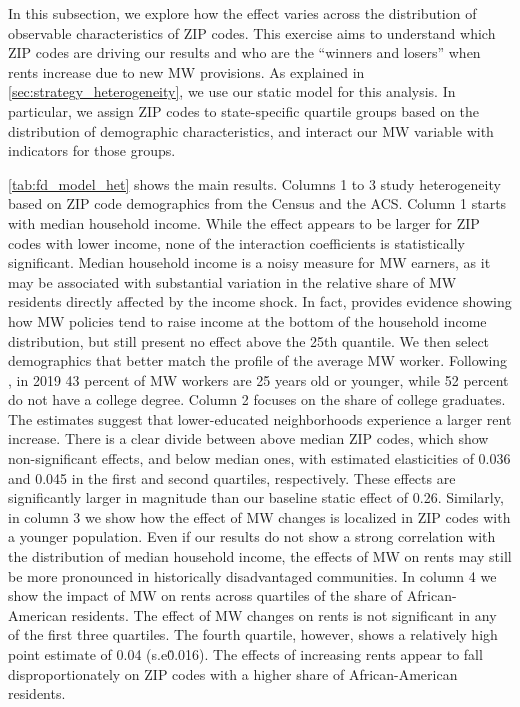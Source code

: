 In this subsection, we explore how the effect varies across the distribution of observable 
characteristics of ZIP codes. This exercise aims to understand which ZIP codes are driving 
our results and who are the ``winners and losers'' when rents increase due to new MW provisions. 
As explained in \autoref{sec:strategy_heterogeneity}, we use our static model for this analysis. 
In particular, we assign ZIP codes to state-specific quartile groups based on the distribution of 
demographic characteristics, and interact our MW variable with indicators for those groups. 

\autoref{tab:fd_model_het} shows the main results. Columns 1 to 3 study heterogeneity based on 
ZIP code demographics from the Census and the ACS. Column 1 starts with median household income. 
While the effect appears to be larger for ZIP codes with lower income, none of the interaction 
coefficients is statistically significant. Median household income is a noisy measure for MW 
earners, as it may be associated with substantial variation in the relative share of MW residents 
directly affected by the income shock. In fact, \textcite{dube2019minimum} provides evidence 
showing how MW policies tend to raise income at the bottom of the household income distribution, 
but still present no effect above the 25th quantile.
We then select demographics that better match the profile of the average MW worker. Following 
\textcite{MinWorkersReportBLS}, in 2019 43 percent of MW workers are 25 years old or younger, 
while 52 percent do not have a college degree. Column 2 focuses on the share of college 
graduates. The estimates suggest that lower-educated neighborhoods experience a larger rent 
increase. There is a clear divide between above median ZIP codes, which show non-significant 
effects, and below median ones, with estimated elasticities of 0.036 and 0.045 in the first and 
second quartiles, respectively. These effects are significantly larger in magnitude than our 
baseline static effect of 0.26. Similarly, in column 3 we show how the effect of MW changes 
is localized in ZIP codes with a younger population. Even if our results do not show a strong 
correlation with the distribution of median household income, the effects of MW on rents may 
still be more pronounced in historically disadvantaged communities. In column 4 we show the 
impact of MW on rents across quartiles of the share of African-American residents. The effect 
of MW changes on rents is not significant in any of the first three quartiles. The fourth 
quartile, however, shows a relatively high point estimate of 0.04 (s.e\. 0.016). The effects 
of increasing rents appear to fall disproportionately on ZIP codes with a higher share 
of African-American residents. 

